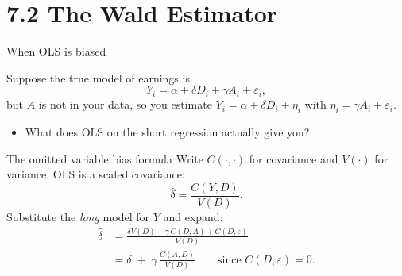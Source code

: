 \documentclass[
  11pt,
  ignorenonframetext,
  aspectratio=169,
]{beamer}
\providecommand{\tightlist}{%
  \setlength{\itemsep}{0pt}\setlength{\parskip}{0pt}}
\begin{document}
\section{7.2 The Wald Estimator}\label{the-wald-estimator}

\begin{frame}{When OLS is biased}
\protect{}\label{when-ols-is-biased}
\begin{center}
\end{center}

Suppose the true model of earnings is \[
Y_i = \alpha + \delta D_i + \gamma A_i + \varepsilon_i,
\] but \(A\) is not in your data, so you estimate
\(Y_i = \alpha + \delta D_i + \eta_i\) with
\(\eta_i = \gamma A_i + \varepsilon_i\).

\begin{itemize}
\tightlist
\item
  What does OLS on the short regression actually give you?
\end{itemize}
\end{frame}

\begin{frame}{The omitted variable bias formula}
\protect{}\label{the-omitted-variable-bias-formula}
Write \(C(\cdot,\cdot)\) for covariance and \(V(\cdot)\) for variance.
OLS is a scaled covariance: \[
\hat\delta = \frac{C(Y, D)}{V(D)}.
\] Substitute the \emph{long} model for \(Y\) and expand: \[
\begin{aligned}
\hat\delta
&= \frac{\delta V(D) + \gamma\,C(D,A) + C(D,\varepsilon)}{V(D)} \\[0.3em]
&= \delta \;+\; \gamma\,\frac{C(A,D)}{V(D)}
\qquad\text{since } C(D,\varepsilon) = 0 .
\end{aligned}
\]
\end{frame}
\end{document}
